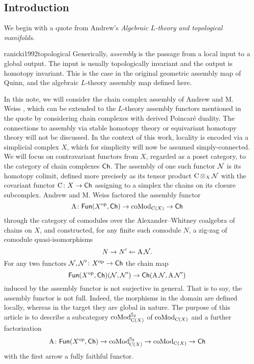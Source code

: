 
\subsection{Introduction}\label{ss:introduction}

We begin with a quote from Andrew's \textit{Algebraic $L$-theory and topological manifolds}.
\begin{displaycquote}{ranicki1992topological}
	Generically, \textit{assembly} is the passage from a local input to a global output.
	The input is usually topologically invariant and the output is homotopy invariant.
	This is the case in the original geometric assembly map of Quinn, and the algebraic $L$-theory assembly map defined here.
\end{displaycquote}
In this note, we will consider the chain complex assembly of Andrew and M. Weiss \cite{ranicki1990assembly}, which can be extended to the $L$-theory assembly functors mentioned in the quote by considering chain complexes with derived Poincar\'e duality.
The connections to assembly via stable homotopy theory \cite{weiss1995asssembly} or equivariant homotopy theory \cite{davis1998assembly} will not be discussed.
In the context of this work, locality is encoded via a simplicial complex $X$, which for simplicity will now be assumed simply-connected.
We will focus on contravariant functors from $X$, regarded as a poset category, to the category of chain complexes $\mathsf{Ch}$.
The assembly of one such functor $\mathcal{N}$ is its homotopy colimit, defined more precisely as its tensor product $\operatorname{C} \operatorname*{\otimes}_X \mathcal{N}$ with the covariant functor $\operatorname{C} \colon X \to \mathsf{Ch}$ assigning to a simplex the chains on its closure subcomplex.
Andrew and M. Weiss factored the assembly functor
\[
\operatorname{A} \colon \mathsf{Fun}(X^{\mathrm{op}}, \mathsf{Ch}) \to \operatorname{coMod}_{\operatorname{C}(X)} \to \mathsf{Ch}
\]
through the category of comodules over the Alexander--Whitney coalgebra of chains on $X$, and constructed, for any finite such comodule $N$, a zig-zag of comodule quasi-isomorphisms
\[
N \to N' \leftarrow \operatorname{A} \mathcal{N}.
\]
For any two functors $\mathcal{N},\mathcal{N}' \colon X^{\mathrm{op}} \to \mathsf{Ch}$ the chain map
\[
\mathsf{Fun}(X^{\mathrm{op}},\mathsf{Ch})(\mathcal{N},\mathcal{N}') \to \mathsf{Ch}(\operatorname{A} \mathcal{N}, \operatorname{A} \mathcal{N}')
\]
induced by the assembly functor is not surjective in general.
That is to say, the assembly functor is not full.
Indeed, the morphisms in the domain are defined locally, whereas in the target they are global in nature.
The purpose of this article is to describe a subcategory $\operatorname{coMod}^{\mathbb{S}_2}_{\operatorname{C}(X)}$ of $\operatorname{coMod}_{\operatorname{C}(X)}$ and a further factorization
\[
\operatorname{A} \colon \mathsf{Fun}(X^{\mathrm{op}}, \mathsf{Ch}) \to
\operatorname{coMod}^{\mathbb{S}_2}_{\operatorname{C}(X)} \to
\operatorname{coMod}_{\operatorname{C}(X)} \to
\mathsf{Ch}
\]
with the first arrow a fully faithful functor.

